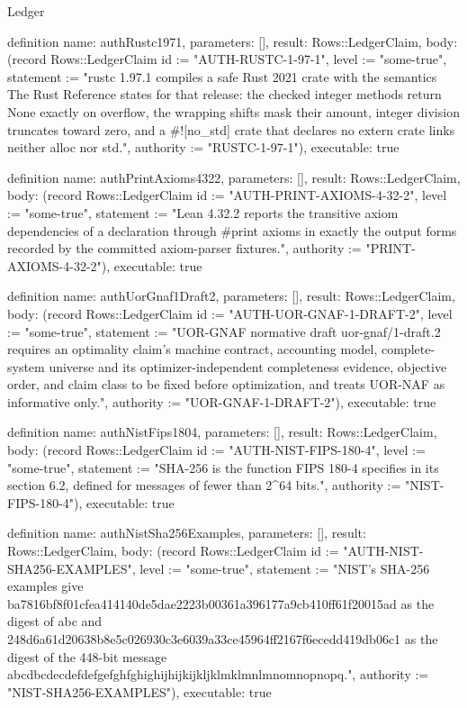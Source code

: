 \begin{lexlean}{Ledger}
\begin{semanticmodule}
definition{
  name: authRustc1971,
  parameters: [],
  result: Rows::LedgerClaim,
  body: (record Rows::LedgerClaim {id := "AUTH-RUSTC-1-97-1", level := "some-true", statement := "rustc 1.97.1 compiles a safe Rust 2021 crate with the semantics The Rust Reference states for that release: the checked integer methods return None exactly on overflow, the wrapping shifts mask their amount, integer division truncates toward zero, and a #![no_std] crate that declares no extern crate links neither alloc nor std.", authority := "RUSTC-1-97-1"}),
  executable: true
}

definition{
  name: authPrintAxioms4322,
  parameters: [],
  result: Rows::LedgerClaim,
  body: (record Rows::LedgerClaim {id := "AUTH-PRINT-AXIOMS-4-32-2", level := "some-true", statement := "Lean 4.32.2 reports the transitive axiom dependencies of a declaration through #print axioms in exactly the output forms recorded by the committed axiom-parser fixtures.", authority := "PRINT-AXIOMS-4-32-2"}),
  executable: true
}

definition{
  name: authUorGnaf1Draft2,
  parameters: [],
  result: Rows::LedgerClaim,
  body: (record Rows::LedgerClaim {id := "AUTH-UOR-GNAF-1-DRAFT-2", level := "some-true", statement := "UOR-GNAF normative draft uor-gnaf/1-draft.2 requires an optimality claim's machine contract, accounting model, complete-system universe and its optimizer-independent completeness evidence, objective order, and claim class to be fixed before optimization, and treats UOR-NAF as informative only.", authority := "UOR-GNAF-1-DRAFT-2"}),
  executable: true
}

definition{
  name: authNistFips1804,
  parameters: [],
  result: Rows::LedgerClaim,
  body: (record Rows::LedgerClaim {id := "AUTH-NIST-FIPS-180-4", level := "some-true", statement := "SHA-256 is the function FIPS 180-4 specifies in its section 6.2, defined for messages of fewer than 2^64 bits.", authority := "NIST-FIPS-180-4"}),
  executable: true
}

definition{
  name: authNistSha256Examples,
  parameters: [],
  result: Rows::LedgerClaim,
  body: (record Rows::LedgerClaim {id := "AUTH-NIST-SHA256-EXAMPLES", level := "some-true", statement := "NIST's SHA-256 examples give ba7816bf8f01cfea414140de5dae2223b00361a396177a9cb410ff61f20015ad as the digest of abc and 248d6a61d20638b8e5c026930c3e6039a33ce45964ff2167f6ecedd419db06c1 as the digest of the 448-bit message abcdbcdecdefdefgefghfghighijhijkijkljklmklmnlmnomnopnopq.", authority := "NIST-SHA256-EXAMPLES"}),
  executable: true
}


\end{semanticmodule}
\end{lexlean}
